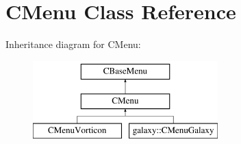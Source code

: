 \hypertarget{class_c_menu}{
\section{CMenu Class Reference}
\label{class_c_menu}
}
Inheritance diagram for CMenu:\begin{figure}[H]
\begin{center}
\leavevmode
\includegraphics[height=3cm]{class_c_menu}
\end{center}
\end{figure}

